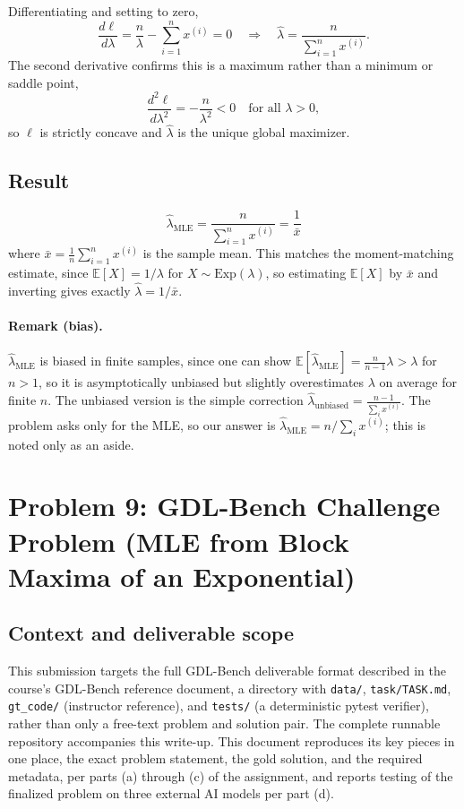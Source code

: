 \documentclass[11pt]{article}
\begin{document}
Differentiating and setting to zero,
\[
  \frac{d\ell}{d\lambda} = \frac{n}{\lambda} - \sum_{i=1}^{n} x^{(i)} = 0
  \quad\Longrightarrow\quad
  \hat\lambda = \frac{n}{\sum_{i=1}^{n} x^{(i)}}.
\]
The second derivative confirms this is a maximum rather than a minimum or
saddle point,
\[
  \frac{d^2\ell}{d\lambda^2} = -\frac{n}{\lambda^2} < 0 \quad \text{for all } \lambda > 0,
\]
so $\ell$ is strictly concave and $\hat\lambda$ is the unique global maximizer.

\subsection*{Result}
\[
  \boxed{\hat\lambda_{\mathrm{MLE}} = \frac{n}{\sum_{i=1}^{n} x^{(i)}} = \frac{1}{\bar x}}
\]
where $\bar x = \frac{1}{n}\sum_{i=1}^n x^{(i)}$ is the sample mean. This
matches the moment-matching estimate, since $\mathbb{E}[X] = 1/\lambda$ for
$X \sim \mathrm{Exp}(\lambda)$, so estimating $\mathbb{E}[X]$ by $\bar x$ and
inverting gives exactly $\hat\lambda = 1/\bar x$.

\paragraph{Remark (bias).} $\hat\lambda_{\mathrm{MLE}}$ is biased in finite
samples, since one can show
$\mathbb{E}[\hat\lambda_{\mathrm{MLE}}] = \frac{n}{n-1}\lambda > \lambda$ for
$n>1$, so it is asymptotically unbiased but slightly overestimates $\lambda$ on
average for finite $n$. The unbiased version is the simple correction
$\hat\lambda_{\mathrm{unbiased}} = \frac{n-1}{\sum_i x^{(i)}}$. The problem asks
only for the MLE, so our answer is
$\hat\lambda_{\mathrm{MLE}} = n / \sum_i x^{(i)}$; this is noted only as an
aside.
\newpage
\section{Problem 9: GDL-Bench Challenge Problem (MLE from Block Maxima of an Exponential)}

\subsection*{Context and deliverable scope}

This submission targets the full GDL-Bench deliverable format described in the
course's GDL-Bench reference document, a directory with \texttt{data/},
\texttt{task/TASK.md}, \texttt{gt\_code/} (instructor reference), and
\texttt{tests/} (a deterministic pytest verifier), rather than only a free-text
problem and solution pair. The complete runnable repository accompanies this
write-up. This document reproduces its key pieces in one place, the exact
problem statement, the gold solution, and the required metadata, per parts (a)
through (c) of the assignment, and reports testing of the finalized problem on
three external AI models per part (d).
\end{document}
